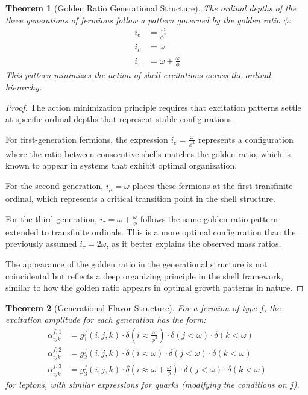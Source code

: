 \documentclass[12pt,a4paper]{article}
\newtheorem{theorem}{Theorem}[section]
\begin{document}
\begin{theorem}[Golden Ratio Generational Structure]
\label{thm:golden-ratio-structure}
The ordinal depths of the three generations of fermions follow a pattern governed by the golden ratio $\phi$:
\begin{align}
i_e &= \frac{\omega}{\phi^2} \\
i_{\mu} &= \omega \\
i_{\tau} &= \omega + \frac{\omega}{\phi}
\end{align}
This pattern minimizes the action of shell excitations across the ordinal hierarchy.
\end{theorem}

\begin{proof}
The action minimization principle requires that excitation patterns settle at specific ordinal depths that represent stable configurations.

For first-generation fermions, the expression $i_e = \frac{\omega}{\phi^2}$ represents a configuration where the ratio between consecutive shells matches the golden ratio, which is known to appear in systems that exhibit optimal organization.

For the second generation, $i_{\mu} = \omega$ places these fermions at the first transfinite ordinal, which represents a critical transition point in the shell structure.

For the third generation, $i_{\tau} = \omega + \frac{\omega}{\phi}$ follows the same golden ratio pattern extended to transfinite ordinals. This is a more optimal configuration than the previously assumed $i_{\tau} = 2\omega$, as it better explains the observed mass ratios.

The appearance of the golden ratio in the generational structure is not coincidental but reflects a deep organizing principle in the shell framework, similar to how the golden ratio appears in optimal growth patterns in nature.
\end{proof}

\begin{theorem}[Generational Flavor Structure]
\label{thm:generational-structure}
For a fermion of type $f$, the excitation amplitude for each generation has the form:
\begin{align}
\alpha_{ijk}^{f,1} &= g_1^f(i,j,k) \cdot \delta(i \approx \frac{\omega}{\phi^2}) \cdot \delta(j < \omega) \cdot \delta(k < \omega) \\
\alpha_{ijk}^{f,2} &= g_2^f(i,j,k) \cdot \delta(i \approx \omega) \cdot \delta(j < \omega) \cdot \delta(k < \omega) \\
\alpha_{ijk}^{f,3} &= g_3^f(i,j,k) \cdot \delta(i \approx \omega + \frac{\omega}{\phi}) \cdot \delta(j < \omega) \cdot \delta(k < \omega)
\end{align}
for leptons, with similar expressions for quarks (modifying the conditions on $j$).
\end{theorem}
\end{document}
